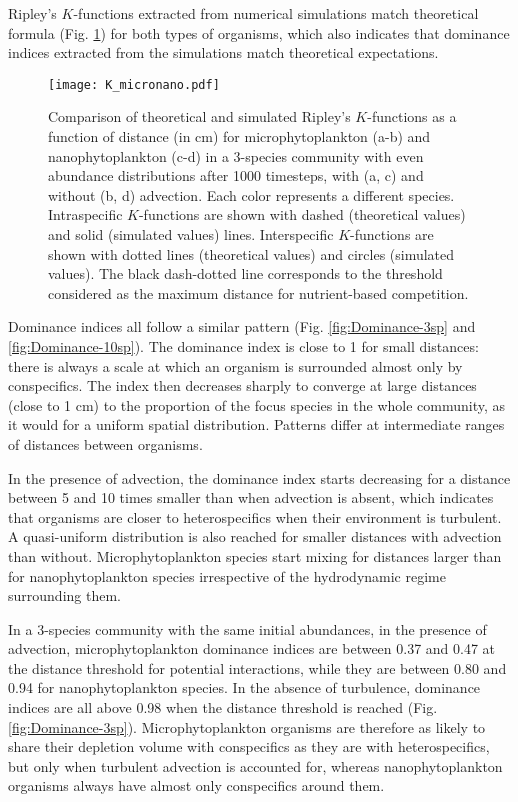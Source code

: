 \documentclass[12pt,english]{article}
\begin{document}
Ripley's $K$-functions extracted from numerical simulations match
theoretical formula (Fig. \ref{fig:Ripley's-K-function}) for both
types of organisms, which also indicates that dominance indices extracted
from the simulations match theoretical expectations.

\begin{figure}[H]
\begin{centering}
\texttt{[image: K\_micronano.pdf]} 
\par\end{centering}
\caption{Comparison of theoretical and simulated Ripley's $K$-functions as
a function of distance (in cm) for microphytoplankton (a-b) and nanophytoplankton
(c-d) in a 3-species community with even abundance distributions after
1000 timesteps, with (a, c) and without (b, d) advection. Each color
represents a different species. Intraspecific $K$-functions are shown
with dashed (theoretical values) and solid (simulated values) lines.
Interspecific $K$-functions are shown with dotted lines (theoretical
values) and circles (simulated values). The black dash-dotted line
corresponds to the threshold considered as the maximum distance for
nutrient-based competition.\label{fig:Ripley's-K-function}}
\end{figure}

Dominance indices all follow a similar pattern (Fig. \ref{fig:Dominance-3sp}
and \ref{fig:Dominance-10sp}). The dominance index is close to 1
for small distances: there is always a scale at which an organism
is surrounded almost only by conspecifics. The index then decreases
sharply to converge at large distances (close to 1 cm) to the proportion
of the focus species in the whole community, as it would for a uniform
spatial distribution. Patterns differ at intermediate ranges of distances
between organisms.

In the presence of advection, the dominance index starts decreasing
for a distance between 5 and 10 times smaller than when advection
is absent, which indicates that organisms are closer to heterospecifics
when their environment is turbulent. A quasi-uniform distribution
is also reached for smaller distances with advection than without.
Microphytoplankton species start mixing for distances larger than
for nanophytoplankton species irrespective of the hydrodynamic regime
surrounding them.

In a 3-species community with the same initial abundances, in the
presence of advection, microphytoplankton dominance indices are between
0.37 and 0.47 at the distance threshold for potential interactions,
while they are between 0.80 and 0.94 for nanophytoplankton species.
In the absence of turbulence, dominance indices are all above 0.98
when the distance threshold is reached (Fig. \ref{fig:Dominance-3sp}).
Microphytoplankton organisms are therefore as likely to share their
depletion volume with conspecifics as they are with heterospecifics,
but only when turbulent advection is accounted for, whereas nanophytoplankton
organisms always have almost only conspecifics around them.
\end{document}
